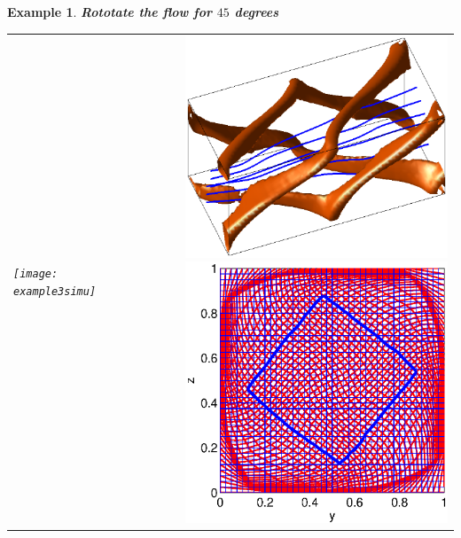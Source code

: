 \documentclass[dvips,landscape]{foils}
\newtheorem{example}{Example}
\begin{document}
\begin{example}{\bfseries Rototate the flow for $45$ degrees}
\begin{tabular}{lr}
\begin{minipage}[b]{12cm}
\vspace{0cm}
\texttt{[image: example3simu]}
 \end{minipage}
 & \begin{minipage}[b]{10cm}
      \includegraphics[width=0.8\textwidth,trim=1cm 0cm 1cm 1cm,clip]{example3structure}
      \includegraphics[width=0.8\textwidth,trim=1cm 1cm 1cm 1cm]{example3grid}
 \end{minipage}
\end{tabular}
\end{example}
\newpage
\end{document}
